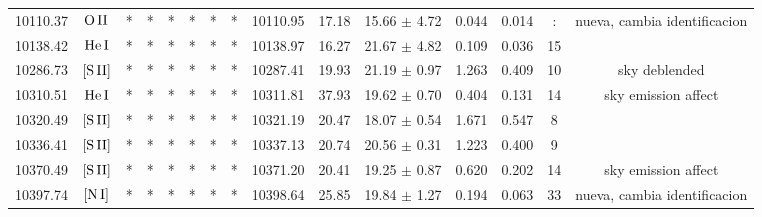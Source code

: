 \documentclass{article}
\begin{document}
\begin{table*}
\begin{adjustbox}{width=\textwidth}
\begin{tabular}{ccccccccccccccc}
10110.37 & $\mbox{O}\thinspace \mbox{II}$ & * & * & * & * & * & * & 10110.95 & 17.18 & 15.66 $\pm$ 4.72 & 0.044 & 0.014 & : &  nueva, cambia identificacion \\
10138.42 & $\mbox{He}\thinspace \mbox{I}$ & * & * & * & * & * & * & 10138.97 & 16.27 & 21.67 $\pm$ 4.82 & 0.109 & 0.036 & 15 &  \\
10286.73 & $\mbox{[S}\thinspace \mbox{II]}$ & * & * & * & * & * & * & 10287.41 & 19.93 & 21.19 $\pm$ 0.97 & 1.263 & 0.409 & 10 &  sky deblended \\
10310.51 & $\mbox{He}\thinspace \mbox{I}$ & * & * & * & * & * & * & 10311.81 & 37.93 & 19.62 $\pm$ 0.70 & 0.404 & 0.131 & 14 &  sky emission affect \\
10320.49 & $\mbox{[S}\thinspace \mbox{II]}$ & * & * & * & * & * & * & 10321.19 & 20.47 & 18.07 $\pm$ 0.54 & 1.671 & 0.547 & 8 &  \\
10336.41 & $\mbox{[S}\thinspace \mbox{II]}$ & * & * & * & * & * & * & 10337.13 & 20.74 & 20.56 $\pm$ 0.31 & 1.223 & 0.400 & 9 &  \\
10370.49 & $\mbox{[S}\thinspace \mbox{II]}$ & * & * & * & * & * & * & 10371.20 & 20.41 & 19.25 $\pm$ 0.87 & 0.620 & 0.202 & 14 &  sky emission affect \\
10397.74 & $\mbox{[N}\thinspace \mbox{I]}$ & * & * & * & * & * & * & 10398.64 & 25.85 & 19.84 $\pm$ 1.27 & 0.194 & 0.063 & 33 &  nueva, cambia identificacion \\
\hline
\end{tabular}
\end{adjustbox}
\end{table*}
\end{document}
